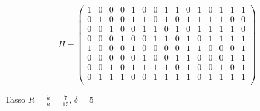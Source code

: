 \begin{example}{}
  \[
H = \left(
\begin{array}{ccccccccccccccc}
1 & 0 & 0 & 0 & 1 & 0 & 0 & 1 & 1 & 0 & 1 & 0 & 1 & 1 & 1 \\
0 & 1 & 0 & 0 & 1 & 1 & 0 & 1 & 0 & 1 & 1 & 1 & 1 & 0 & 0 \\
0 & 0 & 1 & 0 & 0 & 1 & 1 & 0 & 1 & 0 & 1 & 1 & 1 & 1 & 0 \\
0 & 0 & 0 & 1 & 0 & 0 & 1 & 1 & 0 & 1 & 0 & 1 & 1 & 1 & 1 \\
\hline
1 & 0 & 0 & 0 & 1 & 0 & 0 & 0 & 0 & 1 & 1 & 0 & 0 & 0 & 1 \\
0 & 0 & 0 & 0 & 0 & 1 & 0 & 0 & 1 & 1 & 0 & 0 & 0 & 1 & 1 \\
0 & 0 & 1 & 0 & 1 & 1 & 1 & 1 & 0 & 1 & 0 & 0 & 1 & 0 & 1 \\
0 & 1 & 1 & 1 & 0 & 0 & 1 & 1 & 1 & 1 & 0 & 1 & 1 & 1 & 1 \\
\end{array}
\right)
\]

  Tasso \(R = \frac{k}{n} = \frac{7}{15}\), \(\delta = 5\)
\end{example}